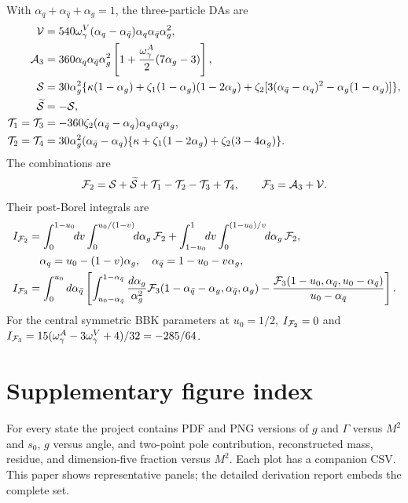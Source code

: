 \documentclass[11pt,a4paper]{article}
\begin{document}
With $\alpha_q+\alpha_{\bar q}+\alpha_g=1$, the three-particle DAs are
\begin{align}
{\cal V}&=540\omega_\gamma^V
(\alpha_q-\alpha_{\bar q})\alpha_q\alpha_{\bar q}\alpha_g^2,\\
{\cal A}_3&=360\alpha_q\alpha_{\bar q}\alpha_g^2
\left[1+{\omega_\gamma^A\over2}(7\alpha_g-3)\right],\\
{\cal S}&=30\alpha_g^2\{\kappa(1-\alpha_g)
+\zeta_1(1-\alpha_g)(1-2\alpha_g)
+\zeta_2[3(\alpha_{\bar q}-\alpha_q)^2
-\alpha_g(1-\alpha_g)]\},\\
\widetilde{\cal S}&=-{\cal S},\\
{\cal T}_1={\cal T}_3&=-360\zeta_2
(\alpha_{\bar q}-\alpha_q)\alpha_q\alpha_{\bar q}\alpha_g,\\
{\cal T}_2={\cal T}_4&=30\alpha_g^2(\alpha_{\bar q}-\alpha_q)
\{\kappa+\zeta_1(1-2\alpha_g)+\zeta_2(3-4\alpha_g)\}.
\end{align}
The combinations are
\begin{equation}
{\cal F}_2={\cal S}+\widetilde{\cal S}+{\cal T}_1-{\cal T}_2
-{\cal T}_3+{\cal T}_4,\qquad
{\cal F}_3={\cal A}_3+{\cal V}.
\end{equation}
Their post-Borel integrals are
\begin{align}
I_{{\cal F}_2}&=
\int_0^{1-u_0}\!\!dv\int_0^{u_0/(1-v)}\!\!d\alpha_g\,{\cal F}_2
+\int_{1-u_0}^{1}\!\!dv\int_0^{(1-u_0)/v}\!\!d\alpha_g\,{\cal F}_2,\\
&\quad \alpha_q=u_0-(1-v)\alpha_g,\quad
\alpha_{\bar q}=1-u_0-v\alpha_g,\\
I_{{\cal F}_3}&=\int_0^{u_0}d\alpha_{\bar q}
\left[\int_{u_0-\alpha_{\bar q}}^{1-\alpha_{\bar q}}
{d\alpha_g\over\alpha_g^2}
{\cal F}_3(1-\alpha_{\bar q}-\alpha_g,\alpha_{\bar q},\alpha_g)
-{{\cal F}_3(1-u_0,\alpha_{\bar q},u_0-\alpha_{\bar q})
\over u_0-\alpha_{\bar q}}\right].
\end{align}
For the central symmetric BBK parameters at $u_0=1/2$,
$I_{{\cal F}_2}=0$ and
$I_{{\cal F}_3}=15(\omega_\gamma^A-3\omega_\gamma^V+4)/32=-285/64$.

\section{Supplementary figure index}

For every state the project contains PDF and PNG versions of $g$ and
$\Gamma$ versus $M^2$ and $s_0$, $g$ versus angle, and two-point pole
contribution, reconstructed mass, residue, and dimension-five fraction versus
$M^2$.  Each plot has a companion CSV.  This paper shows representative
panels; the detailed derivation report embeds the complete set.



\end{document}
